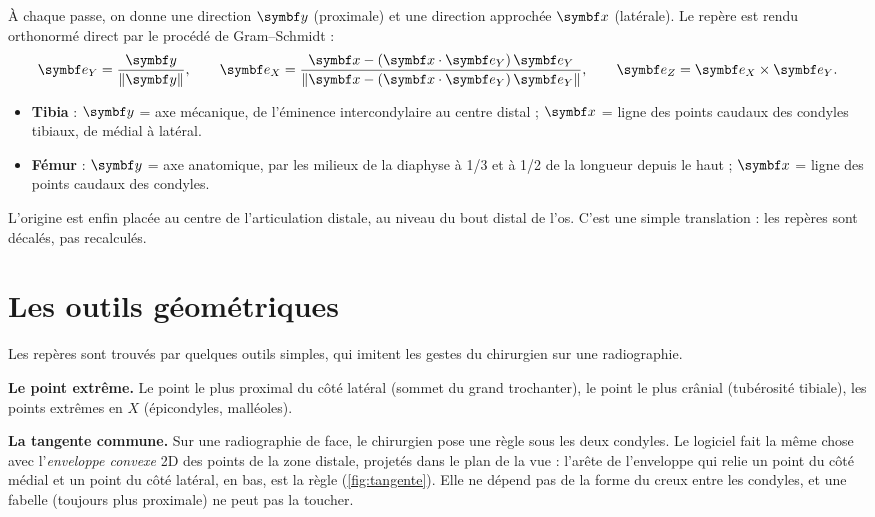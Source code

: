À chaque passe, on donne une direction $\vb{y}$ (proximale) et une direction approchée $\vb{x}$ (latérale). Le repère
est rendu orthonormé direct par le procédé de Gram--Schmidt :
\begin{equation}
  \vb{e}_Y = \frac{\vb{y}}{\norm{\vb{y}}}, \qquad
  \vb{e}_X = \frac{\vb{x} - (\vb{x}\cdot\vb{e}_Y)\,\vb{e}_Y}{\norm{\vb{x} - (\vb{x}\cdot\vb{e}_Y)\,\vb{e}_Y}}, \qquad
  \vb{e}_Z = \vb{e}_X \times \vb{e}_Y.
\end{equation}

\begin{itemize}
  \item \textbf{Tibia} : $\vb{y}$ = axe mécanique, de l'éminence intercondylaire au centre distal ; $\vb{x}$ = ligne
  des points caudaux des condyles tibiaux, de médial à latéral.
  \item \textbf{Fémur} : $\vb{y}$ = axe anatomique, par les milieux de la diaphyse à 1/3 et à 1/2 de la longueur depuis
  le haut \cite{tomlinson2007} ; $\vb{x}$ = ligne des points caudaux des condyles.
\end{itemize}

L'origine est enfin placée au centre de l'articulation distale, au niveau du bout distal de l'os. C'est une simple
translation : les repères sont décalés, pas recalculés.

\section{Les outils géométriques}

Les repères sont trouvés par quelques outils simples, qui imitent les gestes du chirurgien sur une radiographie.

\textbf{Le point extrême.} Le point le plus proximal du côté latéral (sommet du grand trochanter), le point le plus
crânial (tubérosité tibiale), les points extrêmes en $X$ (épicondyles, malléoles).

\textbf{La tangente commune.} Sur une radiographie de face, le chirurgien pose une règle sous les deux condyles. Le
logiciel fait la même chose avec l'\emph{enveloppe convexe} 2D des points de la zone distale, projetés dans le plan de
la vue : l'arête de l'enveloppe qui relie un point du côté médial et un point du côté latéral, en bas, est la règle
(\cref{fig:tangente}). Elle ne dépend pas de la forme du creux entre les condyles, et une fabelle (toujours plus
proximale) ne peut pas la toucher.


